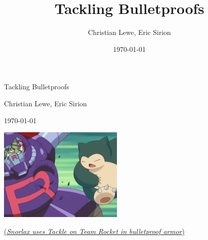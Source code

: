 \documentclass[%
    , 12pt%
    , a4paper%
    , titlepage%
]{article}
\title{Tackling Bulletproofs}
\author{Christian Lewe, Eric Sirion}
\date{\today}
\begin{document}
\begin{titlepage}
    \begin{center}
        \vspace*{5cm}
        {\Huge Tackling Bulletproofs}
        
        \vspace{1.5cm}
        {\large Christian Lewe, Eric Sirion}
        
        \vspace{0.5cm}
        {\large \today}

        \vspace{2cm}
        \includegraphics[width=6cm]{tackle.jpg}

        {\tiny\href{https://vignette.wikia.nocookie.net/pokemon/images/1/13/Ash\_Snorlax\_Tackle.png}{(\emph{Snorlax uses Tackle on Team Rocket in bulletproof armor})}}
    \end{center}
\end{titlepage}

\tableofcontents







\end{document}
